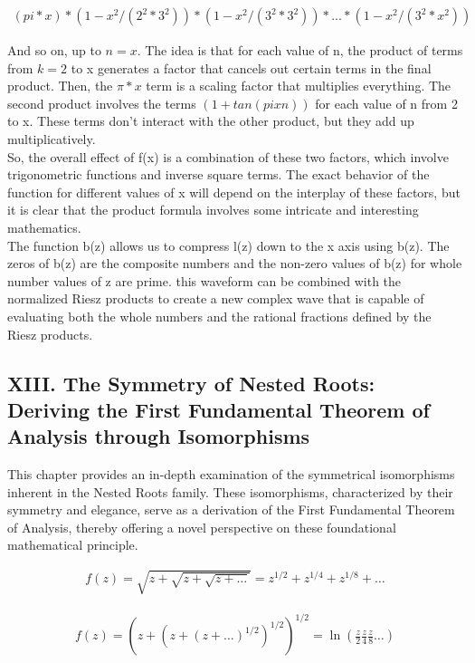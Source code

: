 \documentclass{article}
\begin{document}
\begin{align*}
(pi*x) * (1 - x^2 / (2^2 * 3^2)) * (1 - x^2 / (3^2 * 3^2)) * ... * (1 - x^2 / (3^2 * x^2))
\end{align*}

And so on, up to $n=x$. The idea is that for each value of n, the product of terms from $k=2$ to x generates a factor that cancels out certain terms in the final product. Then, the $\pi*x$ term is a scaling factor that multiplies everything. The second product involves the terms $(1 + tan(pixn))$ for each value of n from 2 to x. These terms don't interact with the other product, but they add up multiplicatively. \\

So, the overall effect of f(x) is a combination of these two factors, which involve trigonometric functions and inverse square terms. The exact behavior of the function for different values of x will depend on the interplay of these factors, but it is clear that the product formula involves some intricate and interesting mathematics. \\

The function b(z) allows us to compress l(z) down to the x axis using b(z). The zeros of b(z) are the composite numbers and the non-zero values of b(z) for whole number values of z are prime. this waveform can be combined with the normalized Riesz products to create a new complex wave that is capable of evaluating both the whole numbers and the rational fractions defined by the Riesz products.

\newpage
\subsection*{XIII. The Symmetry of Nested Roots: Deriving the First Fundamental Theorem of Analysis through Isomorphisms}

This chapter provides an in-depth examination of the symmetrical isomorphisms inherent in the Nested Roots family. These isomorphisms, characterized by their symmetry and elegance, serve as a derivation of the First Fundamental Theorem of Analysis, thereby offering a novel perspective on these foundational mathematical principle.

\begin{align*}
f(z) = \sqrt{z + \sqrt{z + \sqrt{z + \ldots}}} = z^{1/2} + z^{1/4} + z^{1/8} + \ldots
\end{align*}

\begin{align*}
f(z) = \left(z + \left(z + \left(z + \ldots\right)^{1/2}\right)^{1/2}\right)^{1/2} = \ln(\frac{z}{2}\frac{z}{4}\frac{z}{8}\ldots)
\end{align*}
\end{document}
